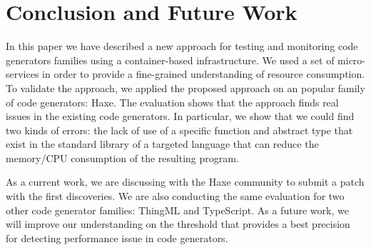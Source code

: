 \section{Conclusion and Future Work}

In this paper we have described a new approach for testing and monitoring code generators families using a container-based infrastructure. 
We used a set of micro-services in order to provide a fine-grained understanding of resource consumption. 
To validate the approach, we applied the proposed approach on an popular family of code generators: Haxe. 
The evaluation shows that the approach finds real issues in the existing code generators. 
In particular, we show that we could find two kinds of errors: the lack of use of a specific function and abstract type that exist in the standard library of a targeted language  that can reduce the memory/CPU consumption of the resulting program.

As a current work, we are discussing with the Haxe community to submit a patch with the first discoveries. 
We are also conducting the same evaluation for two other code generator families: ThingML and TypeScript. 
As a future work, we will improve our understanding on the threshold that provides a best precision for detecting performance issue in code generators. 


